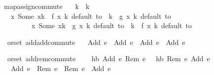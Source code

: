 \begin{isabellebody}
\isamarkupfalse%
\ map{\isacharunderscore}assign{\isacharunderscore}commute{\isacharcolon}\isanewline
\ \ \ {\isachardoublequoteopen}k{}\ {\isasymnoteq}\ k{}{\isachardoublequoteclose}\isanewline
\ \ \ {\isachardoublequoteopen}{\isacharparenleft}{\isasymlambda}x{\isachardot}\ Some\ {\isacharparenleft}x{\isacharparenleft}k{}\ {\isasymmapsto}\ f\ {\isacharparenleft}x\ k{}\ default\ to\ {\isacharbraceleft}{\isacharbraceright}{\isacharparenright}{\isacharcomma}\ k{}\ {\isasymmapsto}\ g\ {\isacharparenleft}x\ k{}\ default\ to\ {\isacharbraceleft}{\isacharbraceright}{\isacharparenright}{\isacharparenright}{\isacharparenright}{\isacharparenright}\ {\isacharequal}\isanewline
\ \ \ \ \ \ \ \ \ {\isacharparenleft}{\isasymlambda}x{\isachardot}\ Some\ {\isacharparenleft}x{\isacharparenleft}k{}\ {\isasymmapsto}\ g\ {\isacharparenleft}x\ k{}\ default\ to\ {\isacharbraceleft}{\isacharbraceright}{\isacharparenright}{\isacharcomma}\ k{}\ {\isasymmapsto}\ f\ {\isacharparenleft}x\ k{}\ default\ to\ {\isacharbraceleft}{\isacharbraceright}{\isacharparenright}{\isacharparenright}{\isacharparenright}{\isacharparenright}{\isachardoublequoteclose}\isanewline
\end{isabellebody}

\begin{isabellebody}
\isamarkupfalse%
\ {\isacharparenleft}\ orset{\isacharparenright}\ add{\isacharunderscore}add{\isacharunderscore}commute{\isacharcolon}\isanewline
\ \ \ {\isachardoublequoteopen}{\isasymlangle}Add\ e{}{\isasymrangle}\ {\isasymrhd}\ {\isasymlangle}Add\ e{}{\isasymrangle}\ {\isacharequal}\ {\isasymlangle}Add\ e{}{\isasymrangle}\ {\isasymrhd}\ {\isasymlangle}Add\ e{}{\isasymrangle}{\isachardoublequoteclose}\isanewline
\end{isabellebody}

\begin{isabellebody}
\isamarkupfalse%
\ {\isacharparenleft}\ orset{\isacharparenright}\ add{\isacharunderscore}rem{\isacharunderscore}commute{\isacharcolon}\isanewline
\ \ \ {\isachardoublequoteopen}{\isasymnot}\ hb\ {\isacharparenleft}Add\ e{}{\isacharparenright}\ {\isacharparenleft}Rem\ e{}{\isacharparenright}\ {\isasymand}\ {\isasymnot}\ hb\ {\isacharparenleft}Rem\ e{}{\isacharparenright}\ {\isacharparenleft}Add\ e{}{\isacharparenright}{\isachardoublequoteclose}\isanewline
\ \ \ {\isachardoublequoteopen}{\isasymlangle}Add\ e{}{\isasymrangle}\ {\isasymrhd}\ {\isasymlangle}Rem\ e{}{\isasymrangle}\ {\isacharequal}\ {\isasymlangle}Rem\ e{}{\isasymrangle}\ {\isasymrhd}\ {\isasymlangle}Add\ e{}{\isasymrangle}{\isachardoublequoteclose}
\end{isabellebody}

